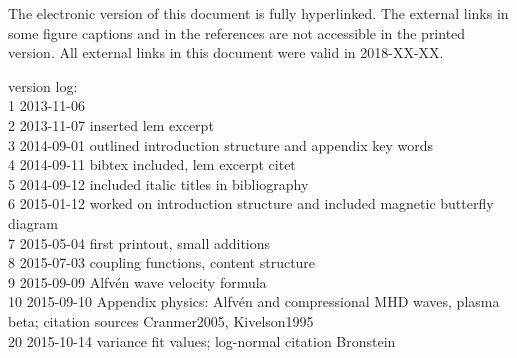 \begin{small}
	\noindent The electronic version of this document is fully hyperlinked. The external links in some figure captions and in the references are not accessible in the printed version. All external links in this document were valid in 2018-XX-XX.
\end{small}

\vfill

\begin{footnotesize}
\noindent version log:\\
1	2013-11-06\\
2	2013-11-07	inserted lem excerpt\\
3	2014-09-01	outlined introduction structure and appendix key words\\
4	2014-09-11	bibtex included, lem excerpt citet\\
5	2014-09-12	included italic titles in bibliography\\
6	2015-01-12	worked on introduction structure and included magnetic butterfly diagram\\
7	2015-05-04	first printout, small additions\\
8	2015-07-03	coupling functions, content structure\\
9	2015-09-09	Alfv\'en wave velocity formula\\
10	2015-09-10	Appendix physics: Alfv\'en and compressional MHD waves, plasma beta; citation sources Cranmer2005, Kivelson1995\\
20	2015-10-14	variance fit values; log-normal citation Bronstein\\

\end{footnotesize}
